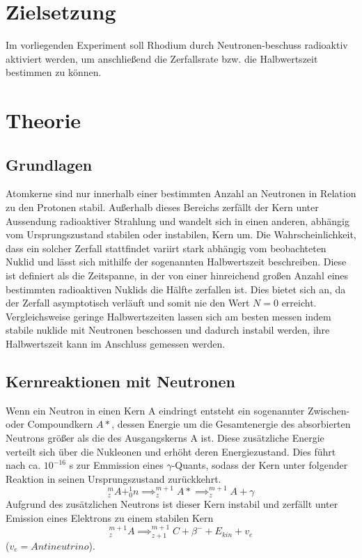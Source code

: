 \section{Zielsetzung}
\label{sec:zielsetzung}
Im vorliegenden Experiment soll Rhodium durch Neutronen-beschuss radioaktiv aktiviert werden, um anschließend 
die Zerfallsrate bzw. die Halbwertszeit bestimmen zu können.
\section{Theorie}
\label{sec:theorie}
\subsection{Grundlagen}
Atomkerne sind nur innerhalb einer bestimmten Anzahl an Neutronen in Relation zu den Protonen stabil. 
Außerhalb dieses Bereichs zerfällt der Kern unter Aussendung radioaktiver Strahlung und wandelt sich in 
einen anderen, abhängig vom Ursprungszustand stabilen oder instabilen, Kern um. Die Wahrscheinlichkeit, 
dass ein solcher Zerfall stattfindet variirt stark abhängig vom beobachteten Nuklid und lässt sich mithilfe 
der sogenannten Halbwertszeit beschreiben. Diese ist definiert als die Zeitspanne, in der von einer 
hinreichend großen Anzahl eines bestimmten radioaktiven Nuklids die Hälfte zerfallen ist. Dies bietet 
sich an, da der Zerfall asymptotisch verläuft und somit nie den Wert $N=0$ erreicht. Vergleichsweise 
geringe Halbwertszeiten lassen sich am besten messen indem stabile nuklide mit Neutronen beschossen und 
dadurch instabil werden, ihre Halbwertszeit kann im Anschluss gemessen werden.
\subsection{Kernreaktionen mit Neutronen}
Wenn ein Neutron in einen Kern A eindringt entsteht ein sogenannter Zwischen- oder Compoundkern $A*$, dessen 
Energie um die Gesamtenergie des absorbierten Neutrons größer als die des Ausgangskerns A ist.  Diese 
zusätzliche Energie verteilt sich über die Nukleonen und erhöht deren Energiezustand. Dies führt nach ca. 
$10^{-16}$ s zur Emmission eines $\gamma$-Quants, sodass der Kern unter folgender Reaktion in seinen 
Ursprungszustand zurückkehrt.
\begin{equation*}
^m_zA + ^1_0n \implies ^{m+1}_zA* \implies ^{m+1}_z A+ \gamma
\end{equation*}
Aufgrund des zusätzlichen Neutrons ist dieser Kern instabil und zerfällt unter Emission eines 
Elektrons zu einem stabilen Kern
\begin{equation*}
^{m+1}_z A \implies  ^{m+1}_{z+1} C + \beta^- + E_{kin} + v_e
\end{equation*}
($v_e = Antineutrino$).
